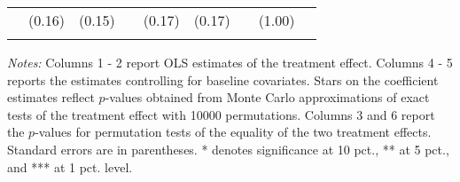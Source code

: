 \begin{table}[htbp]
{\begin{threeparttable}
\begin{tabular}{l*{8}{c}}
          &   (0.16)&   (0.15)&         &   (0.17)&   (0.17)&         &   (1.00)&         \\
          &         &         &         &         &         &         &         &         \\
\bottomrule \end{tabular} \begin{tablenotes}[flushleft] \footnotesize \item \emph{Notes:} Columns 1 - 2 report OLS estimates of the treatment effect. Columns 4 - 5 reports the estimates controlling for baseline covariates. Stars on the coefficient estimates reflect \(p\)-values obtained from Monte Carlo approximations of exact tests of the treatment effect with 10000 permutations. Columns 3 and 6 report the \(p\)-values for permutation tests of the equality of the two treatment effects. Standard errors are in parentheses. * denotes significance at 10 pct., ** at 5 pct., and *** at 1 pct. level. \end{tablenotes} \end{threeparttable} } \end{table}

